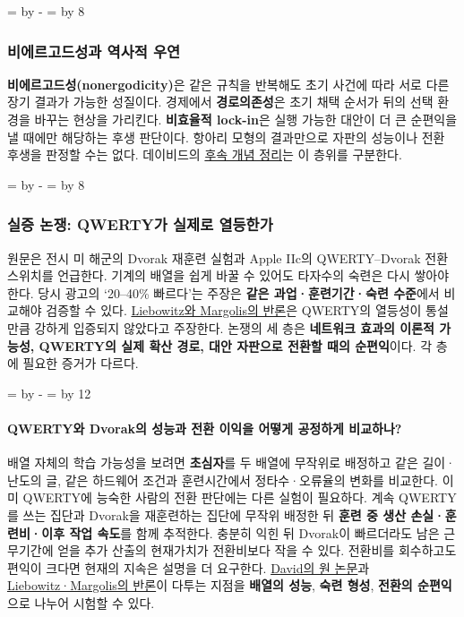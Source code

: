 \documentclass[10pt,a4paper]{article}
\newcommand{\ReserveQuestionSpace}{%
  \par\begingroup
  \dimen0=\pagegoal \advance\dimen0 by -\pagetotal
  \dimen2=\baselineskip \multiply\dimen2 by 12
  \ifdim\dimen0<\dimen2 \newpage\fi
  \endgroup}
\newcommand{\ReserveReadingSectionSpace}{%
  \par\begingroup
  \dimen0=\pagegoal \advance\dimen0 by -\pagetotal
  \dimen2=\baselineskip \multiply\dimen2 by 8
  \ifdim\dimen0<\dimen2 \newpage\fi
  \endgroup}
\begin{document}
\ReserveReadingSectionSpace
\subsubsection*{비에르고드성과 역사적 우연}

\textbf{비에르고드성(nonergodicity)}은 같은 규칙을 반복해도 초기 사건에 따라 서로 다른 장기 결과가 가능한 성질이다. 경제에서 \textbf{경로의존성}은 초기 채택 순서가 뒤의 선택 환경을 바꾸는 현상을 가리킨다. \textbf{비효율적 lock-in}은 실행 가능한 대안이 더 큰 순편익을 낼 때에만 해당하는 후생 판단이다. 항아리 모형의 결과만으로 자판의 성능이나 전환 후생을 판정할 수는 없다. 데이비드의 \href{https://siepr.stanford.edu/publications/working-paper/path-dependence-foundational-concept-historical-social-science-revised}{후속 개념 정리}는 이 층위를 구분한다.\par

\ReserveReadingSectionSpace
\subsubsection*{실증 논쟁: QWERTY가 실제로 열등한가}

원문은 전시 미 해군의 Dvorak 재훈련 실험과 Apple IIc의 QWERTY–Dvorak 전환 스위치를 언급한다. 기계의 배열을 쉽게 바꿀 수 있어도 타자수의 숙련은 다시 쌓아야 한다. 당시 광고의 ‘20–40\% 빠르다’는 주장은 \textbf{같은 과업·훈련기간·숙련 수준}에서 비교해야 검증할 수 있다. \href{https://www.journals.uchicago.edu/doi/abs/10.1086/467198}{Liebowitz와 Margolis의 반론}은 QWERTY의 열등성이 통설만큼 강하게 입증되지 않았다고 주장한다. 논쟁의 세 층은 \textbf{네트워크 효과의 이론적 가능성, QWERTY의 실제 확산 경로, 대안 자판으로 전환할 때의 순편익}이다. 각 층에 필요한 증거가 다르다.\par

\ReserveQuestionSpace
\paragraph{QWERTY와 Dvorak의 성능과 전환 이익을 어떻게 공정하게 비교하나?}
배열 자체의 학습 가능성을 보려면 \textbf{초심자}를 두 배열에 무작위로 배정하고 같은 길이·난도의 글, 같은 하드웨어 조건과 훈련시간에서 정타수·오류율의 변화를 비교한다. 이미 QWERTY에 능숙한 사람의 전환 판단에는 다른 실험이 필요하다. 계속 QWERTY를 쓰는 집단과 Dvorak을 재훈련하는 집단에 무작위 배정한 뒤 \textbf{훈련 중 생산 손실·훈련비·이후 작업 속도}를 함께 추적한다. 충분히 익힌 뒤 Dvorak이 빠르더라도 남은 근무기간에 얻을 추가 산출의 현재가치가 전환비보다 작을 수 있다. 전환비를 회수하고도 편익이 크다면 현재의 지속은 설명을 더 요구한다. \href{https://www.jstor.org/stable/1805621}{David의 원 논문}과 \href{https://www.journals.uchicago.edu/doi/10.1086/467198}{Liebowitz·Margolis의 반론}이 다투는 지점을 \textbf{배열의 성능}, \textbf{숙련 형성}, \textbf{전환의 순편익}으로 나누어 시험할 수 있다.\par
\end{document}
